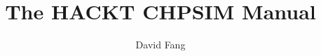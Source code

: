 \documentclass[12pt]{article}
\begin{document}
\title{The HACKT CHPSIM Manual}
\author{David Fang}

\maketitle






\ifpdf{}\fi


\end{document}
